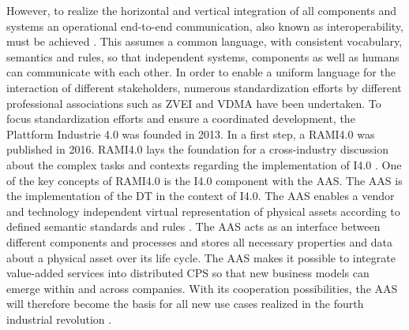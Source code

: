 However, to realize the horizontal and vertical integration of all components and systems an operational end-to-end communication, also known as interoperability, must be achieved \cite[p.858]{Uslander2015ReferenceApproach}. This assumes a common language, with consistent vocabulary, semantics and rules, so that independent systems, components as well as humans can communicate with each other. In order to enable a uniform language for the interaction of different stakeholders, numerous standardization efforts by different professional associations such as \ac{ZVEI} and \ac{VDMA} have been undertaken. To focus standardization efforts and ensure a coordinated development, the Plattform Industrie 4.0 was founded in 2013. In a first step, a \ac{RAMI4.0} was published in 2016. \ac{RAMI4.0} lays the foundation for a cross-industry discussion about the complex tasks and contexts regarding the implementation of \ac{I4.0} \cite[p.4]{Heidel2017ReferenzarchitekturmodellIndustrie4.0Komponente}. One of the key concepts of \ac{RAMI4.0} is the \ac{I4.0} component with the \ac{AAS}. The \ac{AAS} is the implementation of the \ac{DT} in the context of \ac{I4.0}. The \ac{AAS} enables a vendor and technology independent virtual representation of physical assets according to defined semantic standards and rules \cite[p.67]{Heidel2017ReferenzarchitekturmodellIndustrie4.0Komponente}. The \ac{AAS} acts as an interface between different components and processes and stores all necessary properties and data about a physical asset over its life cycle. The \ac{AAS} makes it possible to integrate value-added services into distributed \ac{CPS} so that new business models can emerge within and across companies. With its cooperation possibilities, the \ac{AAS} will therefore become the basis for all new use cases realized in the fourth industrial revolution \cite[p. 67]{Heidel2017ReferenzarchitekturmodellIndustrie4.0Komponente}.    

